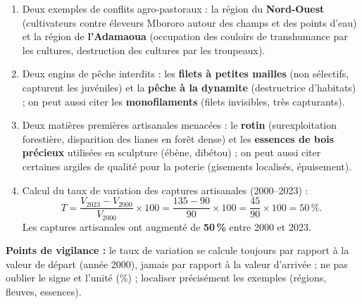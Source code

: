 \documentclass[11pt]{article}
\begin{document}
\begin{corrige}
\begin{enumerate}
\item Deux exemples de conflits agro-pastoraux : la région du \textbf{Nord-Ouest} (cultivateurs contre éleveurs Mbororo autour des champs et des points d'eau) et la région de \textbf{l'Adamaoua} (occupation des couloirs de transhumance par les cultures, destruction des cultures par les troupeaux).
\item Deux engins de pêche interdits : les \textbf{filets à petites mailles} (non sélectifs, capturent les juvéniles) et la \textbf{pêche à la dynamite} (destructrice d'habitats) ; on peut aussi citer les \textbf{monofilaments} (filets invisibles, très capturants).
\item Deux matières premières artisanales menacées : le \textbf{rotin} (surexploitation forestière, disparition des lianes en forêt dense) et les \textbf{essences de bois précieux} utilisées en sculpture (ébène, dibétou) ; on peut aussi citer certaines argiles de qualité pour la poterie (gisements localisés, épuisement).
\item Calcul du taux de variation des captures artisanales (2000–2023) :
\[
T = \frac{V_{2023}-V_{2000}}{V_{2000}}\times 100 = \frac{135-90}{90}\times 100 = \frac{45}{90}\times 100 = 50\,\%.
\]
Les captures artisanales ont augmenté de \textbf{50\,\%} entre 2000 et 2023.
\end{enumerate}
\textbf{Points de vigilance :} le taux de variation se calcule toujours par rapport à la valeur de départ (année 2000), jamais par rapport à la valeur d'arrivée ; ne pas oublier le signe et l'unité (\%) ; localiser précisément les exemples (régions, fleuves, essences).
\end{corrige}
\end{document}
